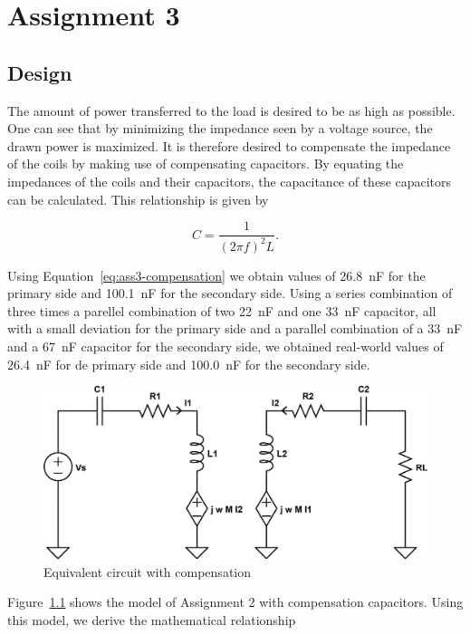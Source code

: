 \documentclass[11pt,titlepage]{report}
\begin{document}
\chapter{Assignment 3}
\section{Design}
The amount of power transferred to the load is desired to be as high as possible. One can see that by minimizing the impedance seen by a voltage source, the drawn power is maximized. It is therefore desired to compensate the impedance of the coils by making use of compensating capacitors. By equating the impedances of the coils and their capacitors, the capacitance of these capacitors can be calculated. This relationship is given by

\begin{equation}
\label{eq:ass3-compensation}
C = \frac{1}{(2 \pi f)^2 L}.
\end{equation}

Using Equation~\ref{eq:ass3-compensation} we obtain values of \SI{26.8}{nF} for the primary side and \SI{100.1}{nF} for the secondary side. Using a series combination of three times a parellel combination of two \SI{22}{nF} and one \SI{33}{nF} capacitor, all with a small deviation for the primary side and a parallel combination of a \SI{33}{nF} and a \SI{67}{nF} capacitor for the secondary side, we obtained real-world values of \SI{26.4}{nF} for de primary side and \SI{100.0}{nF} for the secondary side.

\begin{figure}[H]
	\begin{center}
		\includegraphics[width=0.8\linewidth]{resource/cpt-equivalent-circuit-rc.pdf}
	\end{center}
	\caption{Equivalent circuit with compensation}
	\label{fig:ass3-eq-circ}
\end{figure}


Figure~\ref{fig:ass3-eq-circ} shows the model of Assignment 2 with compensation capacitors. Using this model, we derive the mathematical relationship
\end{document}

